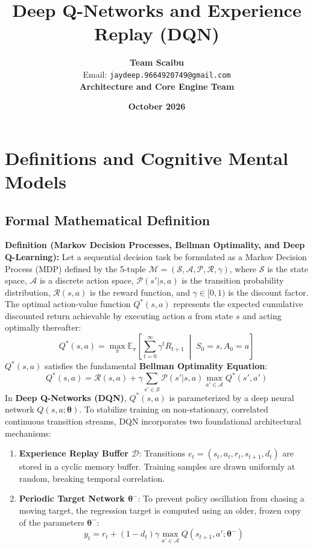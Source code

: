 \documentclass[11pt,a4paper]{article}
\title{\textbf{Deep Q-Networks and Experience Replay (DQN)}}
\author{\textbf{Team Scaibu} \\ \small Email: \texttt{jaydeep.9664920749@gmail.com} \\ \small \textbf{Architecture and Core Engine Team}}
\date{\textbf{October 2026}}
\theoremstyle{definition}
\begin{document}
\maketitle

\section{Definitions and Cognitive Mental Models}

\subsection{Formal Mathematical Definition}
\textbf{Definition (Markov Decision Processes, Bellman Optimality, and Deep Q-Learning):}
Let a sequential decision task be formulated as a Markov Decision Process (MDP) defined by the 5-tuple $\mathcal{M} = (\mathcal{S}, \mathcal{A}, \mathcal{P}, \mathcal{R}, \gamma)$, where $\mathcal{S}$ is the state space, $\mathcal{A}$ is a discrete action space, $\mathcal{P}(s' | s, a)$ is the transition probability distribution, $\mathcal{R}(s, a)$ is the reward function, and $\gamma \in [0, 1)$ is the discount factor. The optimal action-value function $Q^*(s, a)$ represents the expected cumulative discounted return achievable by executing action $a$ from state $s$ and acting optimally thereafter:
{\boldmath
\begin{equation}
Q^*(s, a) = \max_\pi \mathbb{E}_\pi \left[ \sum_{t=0}^\infty \gamma^t R_{t+1} \;\middle|\; S_0 = s, A_0 = a \right]
\end{equation}
}
$Q^*(s, a)$ satisfies the fundamental \textbf{Bellman Optimality Equation}:
{\boldmath
\begin{equation}
Q^*(s, a) = \mathcal{R}(s, a) + \gamma \sum_{s' \in \mathcal{S}} \mathcal{P}(s' | s, a) \max_{a' \in \mathcal{A}} Q^*(s', a')
\end{equation}
}
In \textbf{Deep Q-Networks (DQN)}, $Q^*(s, a)$ is parameterized by a deep neural network $Q(s, a; \boldsymbol{\theta})$. To stabilize training on non-stationary, correlated continuous transition streams, DQN incorporates two foundational architectural mechanisms:
\begin{enumerate}
    \item \textbf{Experience Replay Buffer $\mathcal{D}$}: Transitions $e_t = (s_t, a_t, r_t, s_{t+1}, d_t)$ are stored in a cyclic memory buffer. Training samples are drawn uniformly at random, breaking temporal correlation.
    \item \textbf{Periodic Target Network $\boldsymbol{\theta}^-$}: To prevent policy oscillation from chasing a moving target, the regression target is computed using an older, frozen copy of the parameters $\boldsymbol{\theta}^-$:
    {\boldmath
    \begin{equation}
    y_t = r_t + (1 - d_t) \gamma \max_{a' \in \mathcal{A}} Q(s_{t+1}, a'; \boldsymbol{\theta}^-)
    \end{equation}
    }
\end{enumerate}
\end{document}
